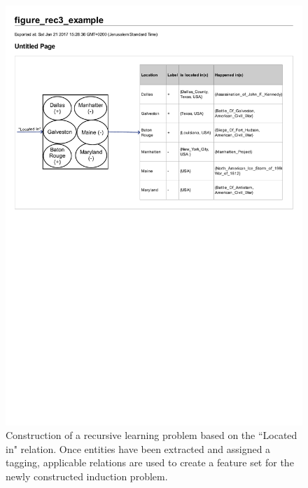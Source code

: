 \documentclass[twoside,11pt]{article}
\theoremstyle{definition}
\begin{document}
\begin{figure}[!h]
	\centering
	\includegraphics[width=\linewidth]{figure_rec3_example}
	\caption{Construction of a recursive learning problem based on the ``Located in" relation. Once entities have been extracted and assigned a tagging, applicable relations are used to create a feature set for the newly constructed induction problem.}
	\label{fig:figure_rec3_example}
\end{figure}
\end{document}
